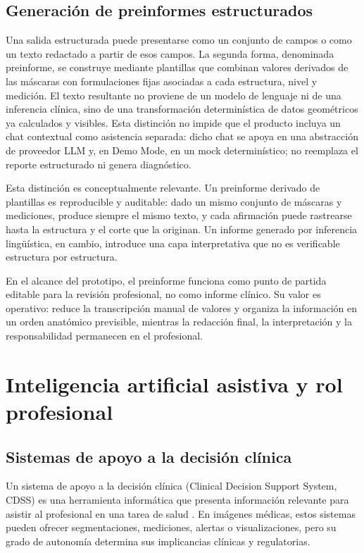 \subsection{Generación de preinformes estructurados}

Una salida estructurada puede presentarse como un conjunto de campos o como un texto redactado a partir de esos campos. La segunda forma, denominada preinforme, se construye mediante plantillas que combinan valores derivados de las máscaras con formulaciones fijas asociadas a cada estructura, nivel y medición. El texto resultante no proviene de un modelo de lenguaje ni de una inferencia clínica, sino de una transformación determinística de datos geométricos ya calculados y visibles. Esta distinción no impide que el producto incluya un chat contextual como asistencia separada: dicho chat se apoya en una abstracción de proveedor LLM y, en Demo Mode, en un mock determinístico; no reemplaza el reporte estructurado ni genera diagnóstico.

Esta distinción es conceptualmente relevante. Un preinforme derivado de plantillas es reproducible y auditable: dado un mismo conjunto de máscaras y mediciones, produce siempre el mismo texto, y cada afirmación puede rastrearse hasta la estructura y el corte que la originan. Un informe generado por inferencia lingüística, en cambio, introduce una capa interpretativa que no es verificable estructura por estructura.

En el alcance del prototipo, el preinforme funciona como punto de partida editable para la revisión profesional, no como informe clínico. Su valor es operativo: reduce la transcripción manual de valores y organiza la información en un orden anatómico previsible, mientras la redacción final, la interpretación y la responsabilidad permanecen en el profesional.

\section{Inteligencia artificial asistiva y rol profesional}

\subsection{Sistemas de apoyo a la decisión clínica}

Un sistema de apoyo a la decisión clínica (Clinical Decision Support System, CDSS) es una herramienta informática que presenta información relevante para asistir al profesional en una tarea de salud \parencite{berner_cdss_2007}. En imágenes médicas, estos sistemas pueden ofrecer segmentaciones, mediciones, alertas o visualizaciones, pero su grado de autonomía determina sus implicancias clínicas y regulatorias.

